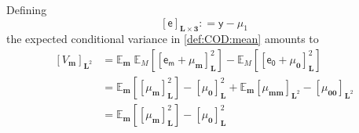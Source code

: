\documentclass[preprint,12pt]{elsarticle}
\newcommand*{\M}[1]{\ensuremath{#1}\xspace}
\newcommand*{\x}{\times}
\newcommand*{\mi}[1]{\mathbf{#1}}
\newcommand*{\rv}[1]{\mathsf{#1}}
\newcommand*{\te}[2][]{\left\lbrack{#2}\right\rbrack_{#1}}
\newcommand*{\deq}{\M{\mathrel{\mathop:}=}}
\newcommand*{\ev}[3][]{\mathbb{E}_{#3}^{#1}\!\left\lbrack{#2}\right\rbrack}
\newcommand*{\evt}[3][]{\mathbb{E}_{#3}^{#1}\!#2}
\begin{document}
    Defining
    \begin{equation}\label{def:SPEst:e}
        \te[\mi{L\x 3}]{\rv{e}} \deq \rv{y} - \mu_{1}
    \end{equation}
    the expected conditional variance in \cref{def:COD:mean} amounts to
    \begin{equation}\label{eq:SPEst:V}
        \begin{aligned}
            \te[\mi{L}^{2}]{V_{\mi{m}}} 
            &= \evt{\;\ev{\te[\mi{L}]{\rv{e_m} + \mu_{\mi{m}}}^{2}}{M}}{\mi{m}}
            - \ev{\te[\mi{L}]{\rv{e_0} + \mu_{\mi{0}}}^{2}}{M} \\
            &= \ev{\te[\mi{L}]{\mu_{\mi{m}}}^{2}}{\mi{m}} - \te[\mi{L}]{\mu_{\mi{0}}}^{2} + 
            \evt{\te[\mi{L}^2]{\mu_{\mi{mm}}}}{\mi{m}} - \te[\mi{L}^2]{\mu_{\mi{00}}} \\
            &= \ev{\te[\mi{L}]{\mu_{\mi{m}}}^{2}}{\mi{m}} - \te[\mi{L}]{\mu_{\mi{0}}}^{2}
        \end{aligned}
    \end{equation}
\end{document}
